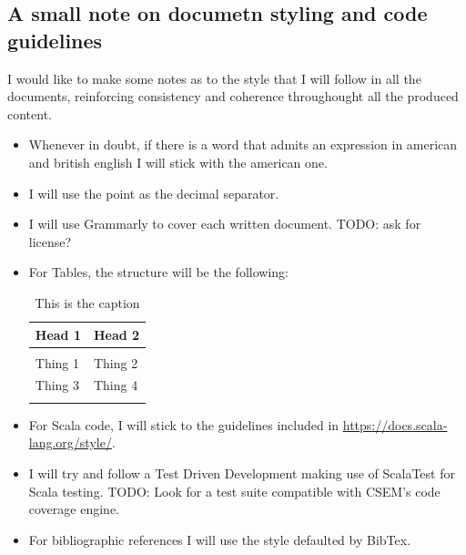 \documentclass{article}
\newcommand{\lline}[1]{\hline\multicolumn{#1}{c}{}\\[-1.34em]\hline}
\begin{document}
\subsection{A small note on documetn styling and code guidelines}
I would like to make some notes as to the style that I will follow in all the documents, reinforcing consistency and coherence throughought all the produced content.
\begin{itemize}
    \item Whenever in doubt, if there is a word that admits an expression in american and british english I will stick with the american one.
    \item I will use the point as the decimal separator.
    \item I will use Grammarly to cover each written document. TODO: ask for license?
    \item For Tables, the structure will be the following:
        \begin{longtable}{p{3cm}p{3cm}} \hline
            \textbf{Head 1}  & \textbf{Head 2} \\[3pt] \lline{2} %
            Thing 1 & Thing 2 \\[3pt]
            Thing 3 & Thing 4 \\[3pt] \hline
            \caption{This is the caption}
        \end{longtable}
    \item For Scala code, I will stick to the guidelines included in \href{https://docs.scala-lang.org/style/}{https://docs.scala-lang.org/style/}.
    \item I will try and follow a Test Driven Development making use of ScalaTest for Scala testing. TODO: Look for a test suite compatible with CSEM's code coverage engine.
    \item For bibliographic references I will use the style defaulted by BibTex.
\end{itemize}

\newpage
\end{document}
